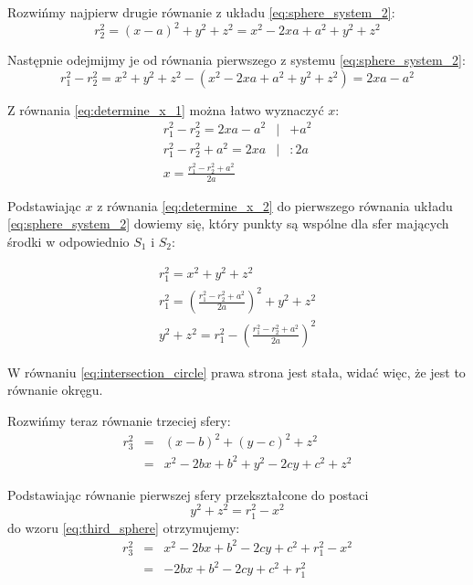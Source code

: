 Rozwińmy najpierw drugie równanie z układu \ref{eq:sphere_system_2}:
\begin{equation}
 r_2^2 = (x - a)^2 + y^2 + z^2 = x^2 - 2xa + a^2 + y^2 + z^2
\end{equation}

Następnie odejmijmy je od równania pierwszego z systemu \ref{eq:sphere_system_2}:
\begin{equation}
 r_1^2 - r_2^2 = x^2 + y^2 + z^2 - (x^2 - 2xa + a^2 + y^2 + z^2) = 2xa - a^2
 \label{eq:determine_x_1}
\end{equation}

Z równania \ref{eq:determine_x_1} można łatwo wyznaczyć $x$:
\begin{eqnarray}
 r_1^2 - r_2^2 = 2xa - a^2 & | & + a^2\\
 r_1^2 - r_2^2 + a^2 = 2xa & | & \colon 2a\\
 x = \frac{r_1^2 - r_2^2 + a^2}{2a} \label{eq:determine_x_2}
\end{eqnarray}

Podstawiając $x$ z równania \ref{eq:determine_x_2} do pierwszego równania układu \ref{eq:sphere_system_2} dowiemy się, który punkty są wspólne dla sfer mających środki w odpowiednio $S_1$ i $S_2$:

\begin{eqnarray}
 r_1^2 = x^2 + y^2 + z^2 \\
 r_1^2 = \left(\frac{r_1^2 - r_2^2 + a^2}{2a}\right)^2 + y^2 + z^2 \\
 y^2 + z^2 = r_1^2 - \left(\frac{r_1^2 - r_2^2 + a^2}{2a}\right)^2 \label{eq:intersection_circle}
\end{eqnarray}

W równaniu \ref{eq:intersection_circle} prawa strona jest stała, widać więc, że jest to równanie okręgu.

Rozwińmy teraz równanie trzeciej sfery:
\begin{eqnarray}
 r^2_3 & = & (x - b)^2 + (y - c)^2 + z^2 \label{eq:third_sphere} \\
       & = & x^2 - 2bx + b^2 + y^2 - 2cy + c^2 + z^2 \nonumber
\end{eqnarray}

Podstawiając równanie pierwszej sfery przekształcone do postaci
\begin{equation*}
 y^2 + z^2 = r_1^2 - x^2
\end{equation*}
do wzoru \ref{eq:third_sphere} otrzymujemy:
\begin{eqnarray}
r_3^2 & = & x^2 - 2bx + b^2 - 2cy + c^2 + r_1^2 - x^2 \label{eq:third_sphere_substituted} \\
      & = & -2bx + b^2 - 2cy + c^2 + r_1^2 \nonumber
\end{eqnarray}

